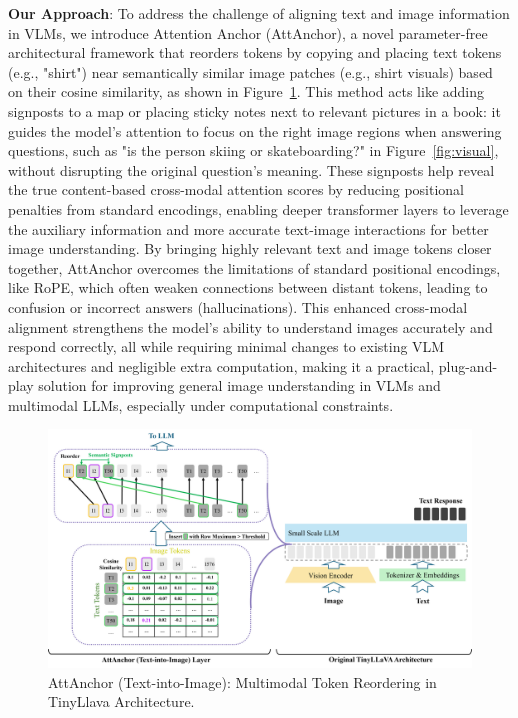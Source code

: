 \documentclass[11pt]{article}
\begin{document}
\textbf{Our Approach}: To address the challenge of aligning text and image information in VLMs, we introduce Attention Anchor (AttAnchor), a novel parameter-free architectural framework that reorders tokens by copying and placing text tokens (e.g., "shirt") near semantically similar image patches (e.g., shirt visuals) based on their cosine similarity, as shown in Figure~\ref{fig:attanchor}. This method acts like adding signposts to a map or placing sticky notes next to relevant pictures in a book: it guides the model’s attention to focus on the right image regions when answering questions, such as "is the person skiing or skateboarding?" in Figure~\ref{fig:visual}, without disrupting the original question’s meaning. These signposts help reveal the true content-based cross-modal attention scores by reducing positional penalties from standard encodings, enabling deeper transformer layers to leverage the auxiliary information and more accurate text-image interactions for better image understanding. By bringing highly relevant text and image tokens closer together, AttAnchor overcomes the limitations of standard positional encodings, like RoPE, which often weaken connections between distant tokens, leading to confusion or incorrect answers (hallucinations). This enhanced cross-modal alignment strengthens the model’s ability to understand images accurately and respond correctly, all while requiring minimal changes to existing VLM architectures and negligible extra computation, making it a practical, plug-and-play solution for improving general image understanding in VLMs and multimodal LLMs, especially under computational constraints. 



\begin{figure}[H]
    \centering
    \includegraphics[width=\linewidth]{Attanchor_arch.png}
    \caption{AttAnchor (Text-into-Image): Multimodal Token Reordering in TinyLlava Architecture.}
    \label{fig:attanchor}
\end{figure}
\end{document}
